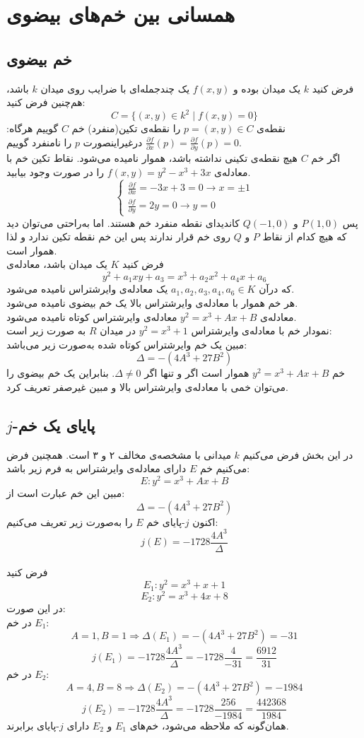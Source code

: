 \chapter{ همسانی بین خم‌های بیضوی}
\section{خم بیضوی}

فرض کنید
$k$
یک میدان بوده و 
$f(x,y)$
یک چندجمله‌ای با ضرایب روی میدان
$k$
باشد، هم‌چنین فرض کنید:
$$C = \{ (x,y) \in k^2 \mid f(x,y) = 0 \}$$
نقطه‌ی 
$p=(x,y) \in C$
را نقطه‌ی تکین(منفرد) خم 
$C$
گوییم هرگاه:
$\frac{\partial f}{\partial x} (p) = \frac{\partial f}{\partial y} (p) = 0 $
درغیراینصورت 
$p$
را نامنفرد گوییم.
\\
اگر خم
$C$
هیچ نقطه‌ی تکینی نداشته باشد، هموار نامیده می‌شود.
\example
نقاط تکین خم با معادله‌ی
$f(x,y) = y^2 - x^3 + 3x$
را در صورت وجود بیابید.
\\
$$
\begin{cases}
\frac{\partial f}{\partial x} = -3x+3=0 \longrightarrow x = \pm 1 \\
\frac{\partial f}{\partial y} = 2y=0 \longrightarrow y=0 
\end{cases}
$$
پس 
$P(1,0)$
و
$Q(-1,0)$
کاندیدای نقطه‌ منفرد خم هستند. اما به‌راحتی می‌توان دید که هیچ کدام از نقاط
$P$
و
$Q$
روی خم قرار ندارند پس این خم نقطه تکین ندارد و لذا هموار است.
\\
فرض کنید
$K$
یک میدان باشد، معادله‌ی
$$ y^2 + a_1xy + a_3 = x^3 + a_2x^2 + a_4x+a_6 $$
که درآن
$a_1,a_2,a_3,a_4,a_6 \in K$
یک معادله‌ی وایرشتراس نامیده می‌شود.
\\
هر خم هموار با معادله‌ی وایرشتراس بالا یک خم بیضوی نامیده می‌شود.
\\
معادله‌ی
$y^2 = x^3+Ax+B$
معادله‌ی وایرشتراس کوتاه نامیده می‌شود.
\\
نمودار خم با معادله‌ی وایرشتراس
$y^2 = x^3+1$
در میدان
$R$
به صورت زیر است:
\\
مبین یک خم وایرشتراس کوتاه شده به‌صورت زیر می‌باشد:
$$\Delta = -(4A^3+27B^2)$$
\remark
خم
$y^2 = x^3+Ax+B$
هموار است اگر و تنها اگر 
$\Delta \ne 0$.
بنابراین یک خم بیضوی را می‌توان خمی با معادله‌ی وایرشتراس بالا و مبین غیرصفر تعریف کرد.
\section{
$j$-پایای یک خم
}
در این بخش فرض می‌کنیم 
$k$
میدانی با مشخصه‌ی مخالف ۲ و ۳ است. همچنین فرض می‌کنیم خم
$E$
دارای معادله‌ی وایرشتراس به فرم زیر باشد:
$$E:y^2=x^3+Ax+B$$
مبین این خم عبارت است از:
$$ \Delta = -(4A^3+27B^2) $$
اکنون $j$-پایای خم
$E$
را به‌صورت زیر تعریف می‌کنیم:
$$ j(E) = -1728\frac{4A^3}{\Delta} $$
\\
\example
فرض کنید
$$ E_1 : y^2 = x^3+x+1 $$
$$ E_2: y^2=x^3+4x+8 $$
در این صورت:
\\
در خم
$E_1$:
$$A=1,B=1 \Longrightarrow \Delta(E_1) = -(4A^3+27B^2) = -31 $$
$$ j(E_1)=-1728\frac{4A^3}{\Delta} = -1728\frac{4}{-31} = \frac{6912}{31} $$
در خم
$E_2$:
$$A=4,B=8 \Longrightarrow \Delta(E_2) = -(4A^3+27B^2) = -1984 $$
$$ j(E_2)=-1728\frac{4A^3}{\Delta} = -1728\frac{256}{-1984} = \frac{442368}{1984} $$
همان‌گونه که ملاحظه می‌شود، خم‌های 
$E_1$
و
$E_2$
دارای
$j$-پایای برابرند.

